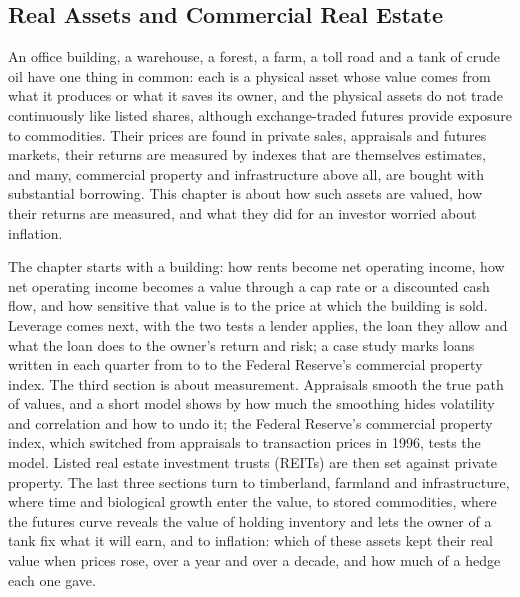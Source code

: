 
\begin{chapterrefs}
\setcounter{chapter}{9}
\chapter{Real Assets and Commercial Real Estate}
\label{ch:realassets}

An office building, a warehouse, a forest, a farm, a toll road and a tank of crude oil have one thing
in common: each is a physical asset whose value comes from what it produces or what it saves its owner,
and the physical assets do not trade continuously like listed shares, although exchange-traded futures
provide exposure to commodities. Their prices are found in private sales,
appraisals and futures markets, their returns are measured by indexes that are themselves estimates,
and many, commercial property and infrastructure above all, are bought with substantial borrowing. This chapter is about how such assets are valued, how
their returns are measured, and what they did for an investor worried about inflation.

The chapter starts with a building: how rents become net operating income, how net operating income
becomes a value through a cap rate or a discounted cash flow, and how sensitive that value is to the
price at which the building is sold. Leverage comes next, with the two tests a lender applies, the
loan they allow and what the loan does to the owner's return and risk; a case study marks loans
written in each quarter from \lcFirst{} to \lcLastStart{} to the Federal Reserve's commercial property index. The third section is about
measurement. Appraisals smooth the true path of values, and a short model shows by how much the
smoothing hides volatility and correlation and how to undo it; the Federal Reserve's commercial
property index, which switched from appraisals to transaction prices in 1996, tests the model. Listed
real estate investment trusts (REITs) are then set against private property. The last three sections
turn to timberland, farmland and infrastructure, where time and biological growth enter the value, to
stored commodities, where the futures curve reveals the value of holding inventory and lets the owner of
a tank fix what it will earn, and to inflation: which of these assets kept their real value when prices
rose, over a year and over a decade, and how much of a hedge each one gave.


\end{chapterrefs}

